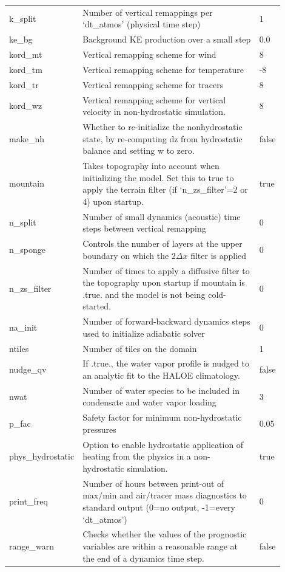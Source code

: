 \documentclass[11pt,fleqn]{report}              %
\begin{document}
\begin{enumerate}
{\begin{longtable}{p{0.13\linewidth} | p{0.69\linewidth} | p{0.08\linewidth} }
 k\_split & Number of vertical remappings per `dt\_atmos' (physical time step) & 1 \\
 ke\_bg & Background KE production over a small step & 0.0 \\
 kord\_mt & Vertical remapping scheme for wind & 8 \\
 kord\_tm & Vertical remapping scheme for temperature & -8 \\
 kord\_tr & Vertical remapping scheme for tracers & 8 \\
 kord\_wz & Vertical remapping scheme for vertical velocity in non-hydrostatic simulation. & 8 \\
 make\_nh & Whether to re-initialize the nonhydrostatic state, by re-computing dz from hydrostatic balance and setting w to zero. & false \\
 mountain & Takes topography into account when initializing the model. Set this to true to apply the terrain filter (if `n\_zs\_filter'=2 or 4) upon startup. & true \\
 n\_split & Number of small dynamics (acoustic) time steps between vertical remapping & 0 \\
 n\_sponge & Controls the number of layers at the upper boundary on which the $2\Delta x$ filter is applied & 0 \\
 n\_zs\_filter & Number of times to apply a diffusive filter to the topography upon startup if mountain is .true. and the model is not being cold-started. & 0 \\
 na\_init & Number of forward-backward dynamics steps used to initialize adiabatic solver & 0 \\
 ntiles & Number of tiles on the domain & 1 \\
 nudge\_qv & If .true., the water vapor profile is nudged to an analytic fit to the HALOE climatology. & false \\
 nwat & Number of water species to be included in condensate and water vapor loading & 3 \\
 p\_fac & Safety factor for minimum non-hydrostatic pressures & 0.05 \\
 phys\_hydrostatic & Option to enable hydrostatic application of heating from the physics in a non-hydrostatic simulation. & true \\
 print\_freq & Number of hours between print-out of max/min and air/tracer mass diagnostics to standard output (0=no output, -1=every `dt\_atmos') & 0 \\
 range\_warn & Checks whether the values of the prognostic variables are within a reasonable range at the end of a dynamics time step. & false \\

\end{longtable}}
\end{enumerate}
\end{document}
